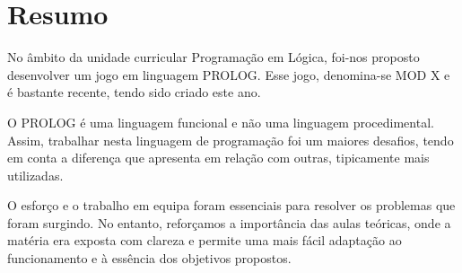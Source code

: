 \documentclass[a4paper]{article}
\begin{document}
%
%
%
%
%
%
%


\section*{Resumo\newline}

No âmbito da unidade curricular Programação em Lógica, foi-nos proposto desenvolver um jogo em linguagem PROLOG. Esse jogo, denomina-se MOD X e é bastante recente, tendo sido criado este ano.

O PROLOG é uma linguagem funcional e não uma linguagem procedimental. Assim, trabalhar nesta linguagem de programação foi um maiores desafios, tendo em conta a diferença que apresenta em relação com outras, tipicamente mais utilizadas.  

O esforço e o trabalho em equipa foram essenciais para resolver os problemas que foram surgindo. No entanto, reforçamos a importância das aulas teóricas, onde a matéria era exposta com clareza e permite uma mais fácil adaptação ao funcionamento e à essência dos objetivos propostos.
\end{document}
